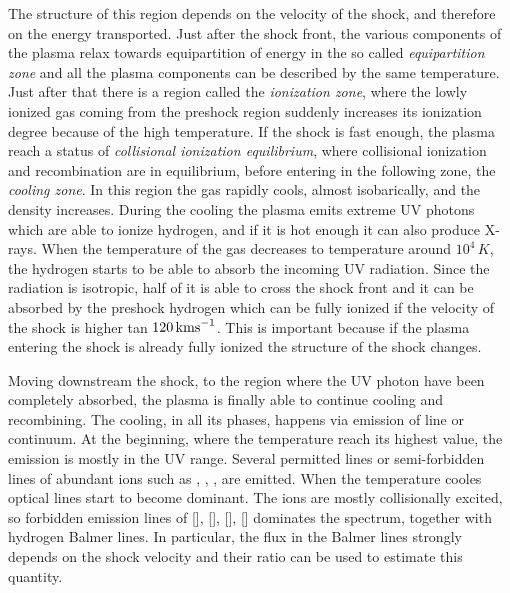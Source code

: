 \documentclass[../main.tex]{subfiles}
\begin{document}
The structure of this region depends on the velocity of the shock, and therefore on the energy transported.
Just after the shock front, the various components of the plasma relax towards equipartition of energy in the so called \emph{equipartition zone} and all the plasma components can be described by the same temperature.
Just after that there is a region called the \emph{ionization zone}, where the lowly ionized gas coming from the preshock region suddenly increases its ionization degree because of the high temperature. 
If the shock is fast enough, the plasma reach a status of \emph{collisional ionization equilibrium}, where collisional ionization and recombination are in equilibrium, before entering in the following zone, the \emph{cooling zone}.
In this region the gas rapidly cools, almost isobarically, and the density increases.
During the cooling the plasma emits extreme UV photons which are able to ionize hydrogen, and if it is hot enough it can also produce X-rays.
When the temperature of the gas decreases to temperature around $10^4\,\si{K}$, the hydrogen starts to be able to absorb the incoming UV radiation.
Since the radiation is isotropic, half of it is able to cross the shock front and it can be absorbed by the preshock hydrogen which can be fully ionized if the velocity of the shock is higher tan $120\,\si{\kms}$.
This is important because if the plasma entering the shock is already fully ionized the structure of the shock changes.

Moving downstream the shock, to the region where the UV photon have been completely absorbed, the plasma is finally able to continue cooling and recombining.
The cooling, in all its phases, happens via emission of line or continuum.
At the beginning, where the temperature reach its highest value, the emission is mostly in the UV range.
Several permitted lines or semi-forbidden lines of abundant ions such as , , ,  are emitted.
When the temperature cooles optical lines start to become dominant.
The ions are mostly collisionally excited, so forbidden emission lines of [], [], [], [] dominates the spectrum, together with hydrogen Balmer lines.
In particular, the flux in the Balmer lines strongly depends on the shock velocity and their ratio can be used to estimate this quantity.







\biblio
\end{document}
